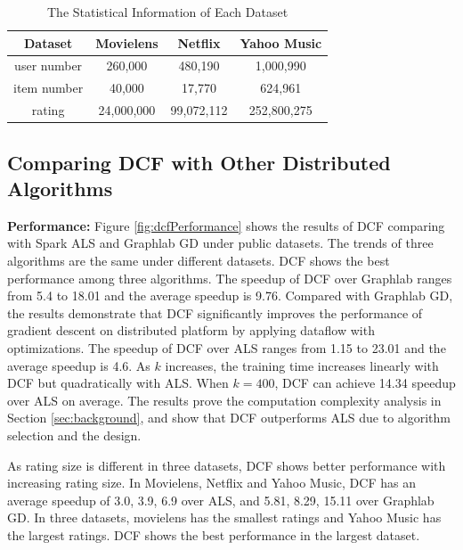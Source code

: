 \documentclass{llncs}
\begin{document}
\vspace{-10pt}
\begin{table}[!htb]
\renewcommand{\arraystretch}{1.3}
\caption{The Statistical Information of Each Dataset}
\label{tab:dataset}
\centering
\begin{tabular}{|c|c|c|c|}
\hline
\textbf{Dataset} & Movielens & Netflix & Yahoo Music\\
\hline
user number & 260,000 & 480,190 & 1,000,990\\
\hline
item number & 40,000 & 17,770 & 624,961\\
\hline
rating & 24,000,000 & 99,072,112 & 252,800,275\\
\hline
\end{tabular}
\vspace{-30pt}
\end{table}

\subsection{Comparing DCF with Other Distributed Algorithms}
\label{sub:dcf}

\textbf{Performance:} Figure \ref{fig:dcfPerformance} shows the results of DCF comparing with Spark ALS and Graphlab GD under public datasets. The trends of three algorithms are the same under different datasets. DCF shows the best performance among three algorithms. The speedup of DCF over Graphlab ranges from 5.4 to 18.01 and the average speedup is 9.76. Compared with Graphlab GD, the results demonstrate that DCF significantly improves the performance of gradient descent on distributed platform by applying dataflow with optimizations. The speedup of DCF over ALS ranges from 1.15 to 23.01 and the average speedup is 4.6. As $k$ increases, the training time increases linearly with DCF but quadratically with ALS. When $k=400$, DCF can achieve 14.34 speedup over ALS on average. The results prove the computation complexity analysis in Section \ref{sec:background}, and show that DCF outperforms ALS due to algorithm selection and the design.

As rating size is different in three datasets, DCF shows better performance with increasing rating size. In Movielens, Netflix and Yahoo Music, DCF has an average speedup of 3.0, 3.9, 6.9 over ALS, and 5.81, 8.29, 15.11 over Graphlab GD. In three datasets, movielens has the smallest ratings and Yahoo Music has the largest ratings. DCF shows the best performance in the largest dataset.
\end{document}
